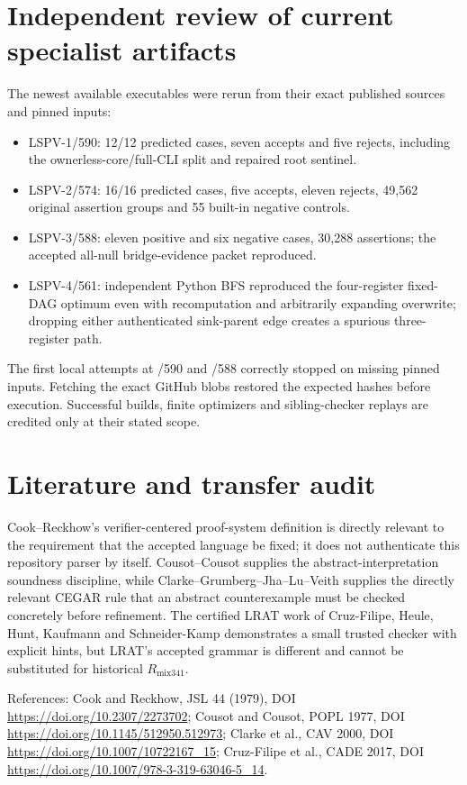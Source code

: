 \documentclass[11pt]{article}
\begin{document}
\section*{Independent review of current specialist artifacts}
The newest available executables were rerun from their exact published sources and pinned inputs:
\begin{itemize}
\item LSPV-1/590: 12/12 predicted cases, seven accepts and five rejects, including the ownerless-core/full-CLI split and repaired root sentinel.
\item LSPV-2/574: 16/16 predicted cases, five accepts, eleven rejects, 49,562 original assertion groups and 55 built-in negative controls.
\item LSPV-3/588: eleven positive and six negative cases, 30,288 assertions; the accepted all-null bridge-evidence packet reproduced.
\item LSPV-4/561: independent Python BFS reproduced the four-register fixed-DAG optimum even with recomputation and arbitrarily expanding overwrite; dropping either authenticated sink-parent edge creates a spurious three-register path.
\end{itemize}
The first local attempts at /590 and /588 correctly stopped on missing pinned inputs.  Fetching the exact GitHub blobs restored the expected hashes before execution.  Successful builds, finite optimizers and sibling-checker replays are credited only at their stated scope.

\section*{Literature and transfer audit}
Cook--Reckhow's verifier-centered proof-system definition is directly relevant to the requirement that the accepted language be fixed; it does not authenticate this repository parser by itself.  Cousot--Cousot supplies the abstract-interpretation soundness discipline, while Clarke--Grumberg--Jha--Lu--Veith supplies the directly relevant CEGAR rule that an abstract counterexample must be checked concretely before refinement.  The certified LRAT work of Cruz-Filipe, Heule, Hunt, Kaufmann and Schneider-Kamp demonstrates a small trusted checker with explicit hints, but LRAT's accepted grammar is different and cannot be substituted for historical \(R_{\mathrm{mix341}}\).

References: Cook and Reckhow, JSL 44 (1979), DOI \url{https://doi.org/10.2307/2273702}; Cousot and Cousot, POPL 1977, DOI \url{https://doi.org/10.1145/512950.512973}; Clarke et al., CAV 2000, DOI \url{https://doi.org/10.1007/10722167_15}; Cruz-Filipe et al., CADE 2017, DOI \url{https://doi.org/10.1007/978-3-319-63046-5_14}.
\end{document}
